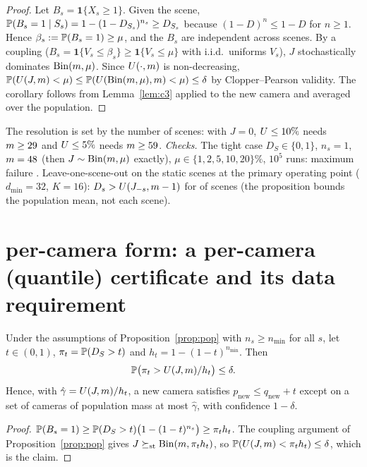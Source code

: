 \begin{proof}
Let $B_s=\mathbf 1\{X_s\ge1\}$. Given the scene, $\mathbb{P}(B_s=1\mid S_s)=1-(1-D_{S_s})^{n_s}\ge D_{S_s}$ because
$(1-D)^n\le 1-D$ for $n\ge1$. Hence $\beta_s:=\mathbb{P}(B_s=1)\ge\mu$, and the $B_s$ are independent across scenes. By a
coupling ($B_s=\mathbf 1\{V_s\le\beta_s\}\ge\mathbf 1\{V_s\le\mu\}$ with i.i.d.\ uniforms $V_s$), $J$ stochastically
dominates $\mathrm{Bin}(m,\mu)$. Since $U(\cdot,m)$ is non-decreasing,
$\mathbb{P}(U(J,m)<\mu)\le\mathbb{P}(U(\mathrm{Bin}(m,\mu),m)<\mu)\le\delta$ by Clopper--Pearson validity. The corollary follows from
Lemma~\ref{lem:c3} applied to the new camera and averaged over the population.
\end{proof}

\begin{remark}
The resolution is set by the number of scenes: with $J=0$, $U\le10\%$ needs $m\ge29$ and
$U\le5\%$ needs $m\ge59$. \emph{Checks.} The tight case $D_S\in\{0,1\}$, $n_s=1$, $m=48$ (then
$J\sim\mathrm{Bin}(m,\mu)$ exactly), $\mu\in\{1,2,5,10,20\}\%$, $10^5$ runs: maximum failure \numPopFailMax. Leave-one-scene-out
on the \numLosoViolDen{} static scenes at the primary operating point ($d_{\min}=32$, $K=16$): $D_s>U(J_{-s},m-1)$ for
\numLosoViolNum{} of \numLosoViolDen{} scenes (the proposition bounds the population mean, not each scene).
\end{remark}

\section{per-camera form: a per-camera (quantile) certificate and its data requirement}

\begin{proposition}\label{prop:c4b}
Under the assumptions of Proposition~\ref{prop:pop} with $n_s\ge n_{\min}$ for all $s$, let $t\in(0,1)$,
$\pi_t=\mathbb{P}(D_S>t)$ and $h_t=1-(1-t)^{n_{\min}}$. Then
\[\mathbb{P}\bigl(\pi_t>U(J,m)/h_t\bigr)\le\delta .\]
Hence, with $\hat\gamma=U(J,m)/h_t$, a new camera satisfies $p_{\mathrm{new}}\le q_{\mathrm{new}}+t$ except on a
set of cameras of population mass at most $\hat\gamma$, with confidence $1-\delta$.
\end{proposition}

\begin{proof}
$\mathbb{P}(B_s=1)\ge\mathbb{P}(D_S>t)\bigl(1-(1-t)^{n_s}\bigr)\ge\pi_th_t$. The coupling argument of Proposition~\ref{prop:pop}
gives $J\succeq_{\mathrm{st}}\mathrm{Bin}(m,\pi_th_t)$, so $\mathbb{P}(U(J,m)<\pi_th_t)\le\delta$, which is the claim.
\end{proof}

